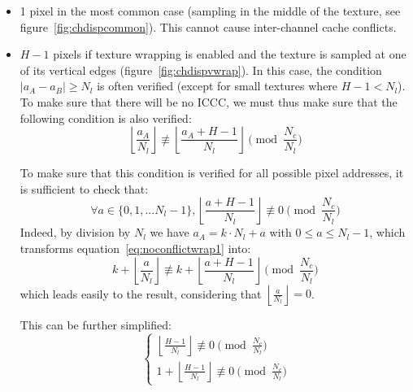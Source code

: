 \documentclass[a4paper,11pt]{kthesis}
\begin{document}
\begin{itemize}
\item 1 pixel in the most common case (sampling in the middle of the texture, see figure~\ref{fig:chdispcommon}). This cannot cause inter-channel cache conflicts.
\item $H-1$ pixels if texture wrapping is enabled and the texture is sampled at one of its vertical edges (figure~\ref{fig:chdispvwrap}). In this case, the condition $|a_{A}-a_{B}| \geq N_{l}$ is often verified (except for small textures where $H-1 < N_{l}$). To make sure that there will be no ICCC, we must thus make sure that the following condition is also verified:
\begin{equation}\label{eq:noconflictwrap1}
\left\lfloor \frac{a_{A}}{N_{l}} \right\rfloor \not \equiv \left\lfloor \frac{a_{A}+H-1}{N_{l}} \right\rfloor \pmod{\frac{N_{c}}{N_{l}}}
\end{equation}

To make sure that this condition is verified for all possible pixel addresses, it is sufficient to check that:
\begin{equation}
\forall a \in \{0, 1, ... N_{l}-1\}, \left\lfloor \frac{a+H-1}{N_{l}} \right\rfloor \not \equiv 0 \pmod{\frac{N_{c}}{N_{l}}}
\end{equation}
Indeed, by division by $N_{l}$ we have $a_{A} = k \cdot N_{l} + a$ with $0 \leq a \leq N_{l}-1$, which transforms equation~\ref{eq:noconflictwrap1} into:
\begin{equation}
k + \left\lfloor \frac{a}{N_{l}} \right\rfloor \not \equiv k + \left\lfloor \frac{a+H-1}{N_{l}} \right\rfloor \pmod{\frac{N_{c}}{N_{l}}}
\end{equation}
which leads easily to the result, considering that $\left\lfloor \frac{a}{N_{l}} \right\rfloor = 0$.

This can be further simplified:
\begin{equation}~\label{eq:noconflictwrap2}
\begin{cases}
\left\lfloor \frac{H-1}{N_{l}} \right\rfloor \not \equiv 0 \pmod{\frac{N_{c}}{N_{l}}} \\
1 + \left\lfloor \frac{H-1}{N_{l}} \right\rfloor \not \equiv 0 \pmod{\frac{N_{c}}{N_{l}}}
\end{cases}
\end{equation}
\end{itemize}
\end{document}
